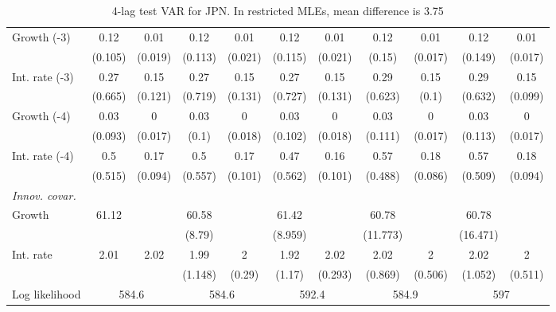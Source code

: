 \begin{table}[htbp]
\begin{tabular}{@{\extracolsep{4pt}}lcccccccccc@{}}
\quad Growth (-3) 	 &0.12 	 & 0.01 	 & 0.12 	 & 0.01 	 & 0.12 	 & 0.01 	 & 0.12 	 & 0.01 	 & 0.12 	 & 0.01	 \\ 
 		 & (0.105) 	 & (0.019) 	 & (0.113) 	 & (0.021) 	 & (0.115) 	 & (0.021) 	 & (0.15) 	 & (0.017) 	 & (0.149) 	 & (0.017) 	 \\ 
\quad Int. rate (-3) 	 &0.27 	 & 0.15 	 & 0.27 	 & 0.15 	 & 0.27 	 & 0.15 	 & 0.29 	 & 0.15 	 & 0.29 	 & 0.15	 \\ 
 		 & (0.665) 	 & (0.121) 	 & (0.719) 	 & (0.131) 	 & (0.727) 	 & (0.131) 	 & (0.623) 	 & (0.1) 	 & (0.632) 	 & (0.099) 	 \\ 
\quad Growth (-4) 	 &0.03 	 & 0 	 & 0.03 	 & 0 	 & 0.03 	 & 0 	 & 0.03 	 & 0 	 & 0.03 	 & 0	 \\ 
 		 & (0.093) 	 & (0.017) 	 & (0.1) 	 & (0.018) 	 & (0.102) 	 & (0.018) 	 & (0.111) 	 & (0.017) 	 & (0.113) 	 & (0.017) 	 \\ 
\quad Int. rate (-4) 	 &0.5 	 & 0.17 	 & 0.5 	 & 0.17 	 & 0.47 	 & 0.16 	 & 0.57 	 & 0.18 	 & 0.57 	 & 0.18	 \\ 
 		 & (0.515) 	 & (0.094) 	 & (0.557) 	 & (0.101) 	 & (0.562) 	 & (0.101) 	 & (0.488) 	 & (0.086) 	 & (0.509) 	 & (0.094) 	 \\ 
\rule{0pt}{4ex} \emph{Innov. covar.}  	 & 	 & 	 & 	 & 	 & 	 & 	 & 	 & 	 & 	 &\\ 
\quad Growth 	 &61.12 	 &  	 & 60.58 	 &  	 & 61.42 	 &  	 & 60.78 	 &  	 & 60.78 	 & 	 \\ 
 		 &  	 &  	 & (8.79) 	 &  	 & (8.959) 	 &  	 & (11.773) 	 &  	 & (16.471) 	 &  	 \\ 
\quad Int. rate 	 &2.01 	 & 2.02 	 & 1.99 	 & 2 	 & 1.92 	 & 2.02 	 & 2.02 	 & 2 	 & 2.02 	 & 2	 \\ 
 		 &  	 &  	 & (1.148) 	 & (0.29) 	 & (1.17) 	 & (0.293) 	 & (0.869) 	 & (0.506) 	 & (1.052) 	 & (0.511) 	 \\ 
 \hline \rule{0pt}{4ex} 
  Log likelihood 	 &\multicolumn{2}{c}{584.6} 	 & \multicolumn{2}{c}{584.6} 	 & \multicolumn{2}{c}{592.4} 	 & \multicolumn{2}{c}{584.9} 	 & \multicolumn{2}{c}{597}\\ 

 \hline 	\end{tabular}		\caption{4-lag test VAR for JPN. In restricted MLEs, mean difference is 3.75}
		\label{tab:JPN4}

\end{table}